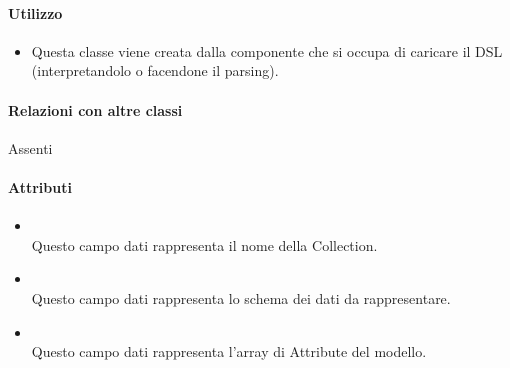 \paragraph*{Utilizzo}
\begin{itemize}
\item[] Questa classe viene creata dalla componente che si occupa di caricare il DSL (interpretandolo o facendone il parsing).
\end{itemize}

\paragraph*{Relazioni con altre classi}
Assenti

\paragraph*{Attributi}
\begin{itemize}
\item[]  \\ Questo campo dati rappresenta il nome della Collection.
\item[]  \\ Questo campo dati rappresenta lo schema  dei dati da rappresentare.
\item[]  \\ Questo campo dati rappresenta l'array di Attribute del modello.
\end{itemize}

